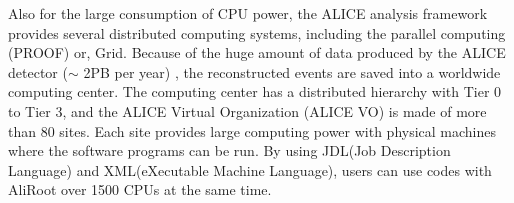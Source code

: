 Also for the large consumption of CPU power, the ALICE analysis framework provides several distributed computing systems, including the parallel computing (PROOF) or, Grid.  Because of the huge amount of data produced by the ALICE detector ($\sim$ 2PB per year) \cite{1742-6596-219-7-072023}, the reconstructed events are saved into a worldwide computing center. The computing center has a distributed hierarchy with Tier 0 to Tier 3, and the ALICE Virtual Organization (ALICE VO) is made of more than 80 sites. Each site provides large computing power with physical machines where the software programs can be run. By using JDL(Job Description Language) and XML(eXecutable Machine Language), users can use codes with AliRoot over 1500 CPUs at the same time.